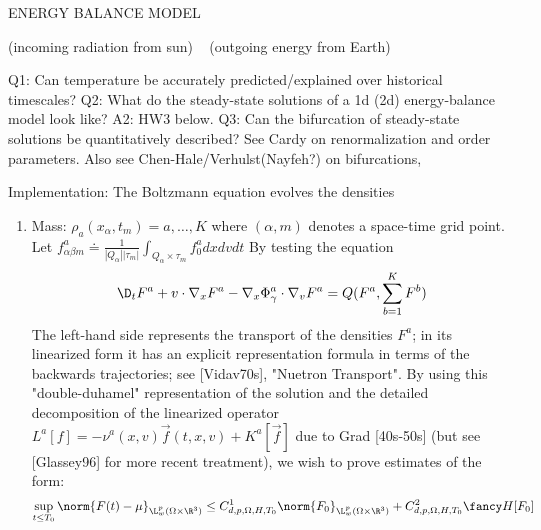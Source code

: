 ENERGY BALANCE MODEL

 (incoming radiation from sun) ~ (outgoing energy from Earth)

 Q1: Can temperature be accurately predicted/explained over
   historical timescales? 
 Q2: What do the steady-state solutions of a 1d (2d) energy-balance
       model look like?
 A2: HW3 below.
 Q3: Can the bifurcation of steady-state solutions be quantitatively
     described? See Cardy on renormalization and order parameters.
     Also see Chen-Hale/Verhulst(Nayfeh?) on bifurcations,  

 Implementation: The Boltzmann equation evolves the densities
   \begin{enumerate}
       \item Mass: $\rho_a(x_\alpha,t_m) = a, \ldots, K$ where
                $(\alpha,m)$ denotes a space-time grid point. Let
                $f_{\alpha\beta m}^a \doteq \frac{1}{|Q_{\alpha}||\tau_m|}\int_{Q_\alpha \times \tau_m} f_0^a dx dv dt$ 
                By testing the equation
                \begin{align}\label{boltzmann_vlasov}
                   \D_t F^a + v \cdot \nabla_x F^a - \nabla_x \Phi^a_\gamma \cdot \nabla_v F^a = Q(F^a, \sum_{b=1}^K F^b)
                \end{align}
                The left-hand side represents the transport of the densities $F^a$; in its linearized form it has an
                explicit representation formula in terms of the backwards trajectories; see [Vidav70s], "Nuetron
                Transport". By using this "double-duhamel" representation of the solution and the detailed 
                decomposition of the linearized operator $L^a[f] = -\nu^a(x,v) \vec{f}(t,x,v) + K^a[\vec{f}]$ due to
                Grad [40s-50s] (but see [Glassey96] for more recent treatment), we wish to prove estimates of the form:
                \begin{align}\label{stability_est}
                   \sup_{t\leq T_0} \norm{ F(t) - \mu }_{\L^p_w(\Omega \times \R^3)} 
                   \leq C^1_{d,p,\Omega,H,T_0}\norm{ F_0 }_{\L^p_w(\Omega \times \R^3)}
                       + C^2_{d,p,\Omega,H,T_0}\fancy H[F_0]
                \end{align}
                

\end{enumerate}
